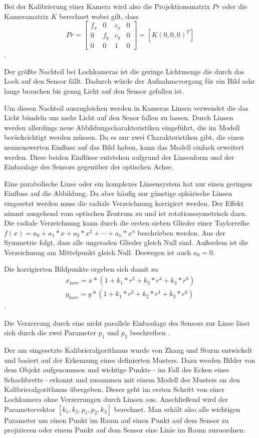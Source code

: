 Bei der Kalibrierung einer Kamera wird also die Projektionsmatrix $Pr$ oder die
Kameramatrix $K$ berechnet wobei gilt, dass \begin{equation} Pr=
  \begin{bmatrix} f_x&0&c_x&0\\ 0&f_y&c_y&0\\ 0&0&1&0 \end{bmatrix} = \left[K
  \left(0,0,0\right)^T\right] \end{equation}.

Der größte Nachteil bei Lochkameras ist die geringe Lichtmenge die durch das
Loch auf den Sensor fällt. Dadurch würde der Aufnahmevorgang für ein Bild sehr
lange brauchen bis genug Licht auf den Sensor gefallen ist.

Um diesen Nachteil auszugleichen werden in Kameras Linsen verwendet die das
Licht bündeln um mehr Licht auf den Senor fallen zu lassen. Durch Linsen werden
allerdings neue Abbildungscharakteristiken eingeführt, die im Modell
berücksichtigt werden müssen. Da es nur zwei Charakteristiken gibt, die einen
nennenswerten Einfluss auf das Bild haben, kann das Modell einfach erweitert
werden. Diese beiden Einflüsse entstehen aufgrund der Linsenform und der
Einbaulage des Sensors gegenüber der optischen Achse. 

Eine parabolische Linse oder ein komplexes Linsensystem hat nur einen geringen
Einfluss auf die Abbildung. Da aber häufig nur günstige sphärische Linsen
eingesetzt werden muss die radiale Verzeichnung korrigiert werden. Der Effekt
nimmt ausgehend vom optischen Zentrum zu und ist rotationssymetrisch dazu. Die
radiale Verzeichnung kann durch die ersten sieben Glieder einer Taylorreihe
$f(x)=a_0+a_1*x+a_2*x^2+\cdots+a_n*x^n$ beschrieben werden. Aus der Symmetrie
folgt, dass alle ungeraden Glieder gleich Null sind. Außerdem ist die
Verzeichnung am Mittelpunkt gleich Null. Deswegen ist auch $a_0=0$.

Die korrigierten Bildpunkte ergeben sich damit zu 
  \begin{align} x_{korr}=x*(1+k_1*r^2+k_2*r^4+k_3*r^6)\\
    y_{korr}=y*(1+k_1*r^2+k_2*r^4+k_3*r^6) \end{align}.

Die Verzerrung durch eine nicht parallele Einbaulage des Sensors zur Linse lässt
sich durch die zwei
Parameter $p_1$ und $p_2$ beschreiben \cite{Bradski2008}.

Der am \cob eingesetzte Kalibrieralgorithmus wurde von Zhang und Sturm
entwickelt und basiert auf der Erkennung eines definierten Musters. Dazu werden
Bilder von dem Objekt aufgenommen und wichtige Punkte - im Fall des \cob Ecken
eines Schachbretts - erkannt und zusammen mit einem Modell des Musters an den
Kalibrieralgorithmus übergeben. Dieser geht im ersten Schritt von einer
Lochkamera ohne Verzerrungen durch Linsen aus. Anschließend wird der
Parametervektor $\left[k_1,k_2,p_1,p_2,k_3\right]$ berechnet.\cite{zhang2000flexible}
Man erhält also alle wichtigen Parameter um einen Punkt im Raum auf einen Punkt auf dem Sensor
zu projizieren oder einem Punkt auf dem Sensor eine Linie im Raum zuzuordnen.

